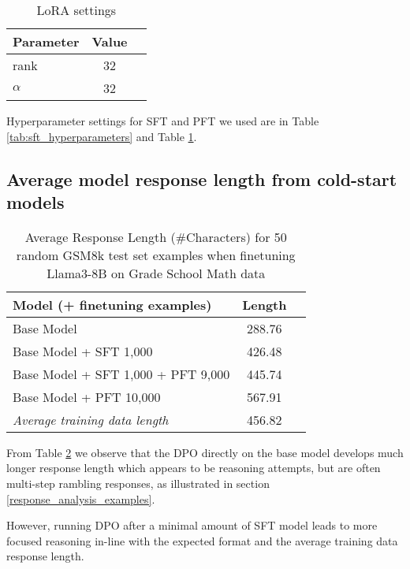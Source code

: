 \begin{table}[h]
\centering
\caption{LoRA settings}
\begin{tabular}{lcc}
\toprule
Parameter & Value \\
\midrule
rank & 32 \\ %
$\alpha$ &  32 \\ %
\bottomrule
\end{tabular}
\label{tab:pft_hyperparameters} %
\end{table}


Hyperparameter settings for SFT and PFT we used are in Table \ref{tab:sft_hyperparameters} and Table \ref{tab:pft_hyperparameters}. 

\subsection{Average model response length from cold-start models}

\begin{table}[h]
\centering
\caption{Average Response Length (\#Characters) for 50 random GSM8k test set examples when finetuning Llama3-8B on Grade School Math data }
\begin{tabular}{lcc}
\toprule
Model (+ finetuning examples) & Length \\
\midrule
Base Model & 288.76 \\ %
Base Model + SFT 1,000 &  426.48 \\ %
Base Model + SFT 1,000 + PFT 9,000 & 445.74 \\ %
Base Model + PFT 10,000 & 567.91 \\ %
\bottomrule
\textit{Average training data length} & 456.82 
\end{tabular}
\label{tab:average_length} %
\end{table}


From Table \ref{tab:average_length} we observe that the DPO directly on the base model develops much longer response length which appears to be reasoning attempts, but are often multi-step rambling responses, as illustrated in section \ref{response_analysis_examples}. 

However, running DPO after a minimal amount of SFT model leads to more focused reasoning in-line with the expected format and the average training data response length. 

